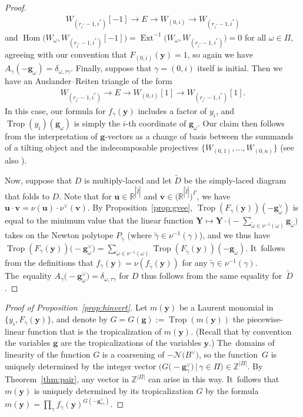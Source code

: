 \documentclass[10pt,a4paper]{amsart}
\def\R{{\mathbb R}}
\def\Z{{\mathbb Z}}
\def\u{{\mathbf{u}}}
\def\Hom{\operatorname{Hom}}
\def\Ext{\operatorname{Ext}}
\def\tD{{\tilde D}}
\def\tI{{\tilde I}}
\def\y{{\mathbf y}}
\def\v{{\mathbf v}}
\def\N{{\mathcal{N}}}
\def\Trop{\operatorname{Trop}}
\def\g{{\mathbf g}}
\def\Y{{\mathbf Y}}
\def\tomega{{\tilde \omega}}
\def\tgamma{{\tilde \gamma}}
\numberwithin{equation}{section}
\begin{document}
\begin{proof}
\begin{gather*}
W_{(r_{i^*}-1,i^*)}[-1] \to E \to W_{(0,i)} \to W_{(r_{i^*}-1,i^*)}
\end{gather*}
and $\Hom\big(W_\omega,W_{(r_{i^*}-1,i^*)}[-1]\big)= \Ext^{-1}\big(W_\omega,W_{(r_{i^*}-1,i^*)}\big) = 0$ for all $\omega \in \Pi$, agreeing with our convention that $F_{(0,i)}(\y) = 1$, so again we have $A_\gamma(-\g_\omega) = \delta_{\omega, \tau \gamma}$. Finally, suppose that $\gamma = (0,i)$ itself is initial. Then we have an Auslander--Reiten triangle of the form
\begin{gather*}
W_{(r_{i^*}-1,i^*)} \to E \to W_{(0,i)}[1] \to W_{(r_{i^*}-1,i^*)} [1].
\end{gather*}
In this case, our formula for $f_\gamma(\y)$ includes a factor of $y_i$, and $\Trop(y_i)(\g_\omega)$ is simply the $i$-th coordinate of $\g_\omega$. Our claim then follows from the interpretation \cite[Section~6]{BDMTY} of $\g$-vectors as a change of basis between the summands of a tilting object and the indecomposable projectives $\big\{W_{(0,1)},\dots,W_{(0,n)}\big\}$ (see also \cite[Theorem~3.23(ii)]{PPPP}).

Now, suppose that $D$ is multiply-laced and let $\tD$ be the simply-laced diagram that folds to $D$. Note that for $\u \in \R^{|\tI|}$ and $\v \in \big(\R^{|\tI|}\big)^\Gamma$, we have $\u \cdot \v = \nu(\u) \cdot \nu^\vee(\v)$.
By Proposition~\ref{prop:gvee}, $\Trop(F_\gamma(\y))(-\g^\vee_\omega)$ is equal to the minimum value that the linear function $\Y \mapsto \Y \cdot \big({-}\sum_{\tomega \in \nu^{-1}(\omega)}\g_\tomega\big)$ takes on the Newton polytope $P_{\tgamma}$ (where $\tgamma \in \nu^{-1}(\gamma)$), and we thus have $\Trop(F_\gamma(\y))\big({-}\g^\vee_\omega\big) = \sum_{\tomega \in \nu^{-1}(\omega)} \Trop(F_\tgamma(\y))(-\g_\tomega)$. It~follows from the definitions that $f_\gamma(\y) = \nu(f_{\tgamma}(\y))$ for any $\tgamma \in \nu^{-1}(\gamma)$. The~equality $A_\gamma\big({-}\g^\vee_\omega\big) = \delta_{\omega, \tau \gamma}$ for $D$ thus follows from the same equality for~$\tD$.
\end{proof}

\begin{proof}[Proof of Proposition~\ref{prop:hinvert}]
Let $m(\y)$ be a Laurent monomial in $\{y_i, F_\gamma(\y)\}$, and denote by $G=G(\g):=\Trop(m(\y))$ the piecewise-linear function that is the tropicalization of $m(\y)$. (Recall that by convention the variables $\g$ are the tropicalizations of the variables $\y$.)
The~domains of linearity of the function $G$ is a coarsening of $-\N\big(B^\vee\big)$, so the function~$G$ is uniquely determined by the integer vector $\big(G\big({-}\g^\vee_\gamma\big) \,|\, \gamma \in \Pi\big) \in \Z^{|\Pi|}$. By Theorem~\ref{thm:pair}, any vector in $\Z^{|\Pi|}$ can arise in this way. It~follows that $m(\y)$ is uniquely determined by its tropicalization $G$ by the formula $m(\y) = \prod_\gamma f_\gamma(\y)^{G(-\g^\vee_{\tau \gamma})}$.
\end{proof}
\end{document}
